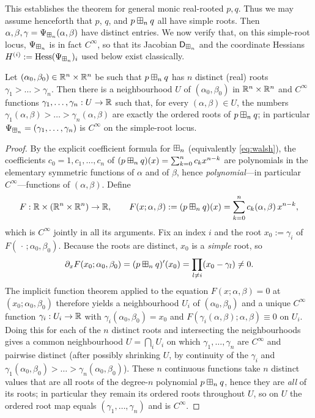 This establishes the theorem for general monic real-rooted $p,q$. Thus we may assume henceforth that $p$, $q$,
and $p\boxplus_n q$ all have simple roots. Then
$\alpha,\beta,\gamma=\Psi_{\boxplus_n}(\alpha,\beta)$ have distinct entries. We now
verify that, on this simple-root locus, $\Psi_{\boxplus_n}$ is in fact $C^\infty$, so
that its Jacobian $\mathsf{D}_{\boxplus_n}$ and the coordinate Hessians
$H^{(i)}:=\operatorname{Hess}(\Psi_{\boxplus_n})_i$ used below exist classically.

\begin{qfourlemma}\label{lem:smooth}
Let $(\alpha_0,\beta_0)\in\mathbb{R}^n\times\mathbb{R}^n$ be such that $p\boxplus_n q$
has $n$ distinct (real) roots $\gamma_1>\dots>\gamma_n$. Then there is a
neighbourhood $U$ of $(\alpha_0,\beta_0)$ in $\mathbb{R}^n\times\mathbb{R}^n$ and
$C^\infty$ functions $\gamma_1,\dots,\gamma_n:U\to\mathbb{R}$ such that, for every
$(\alpha,\beta)\in U$, the numbers $\gamma_1(\alpha,\beta)>\dots>\gamma_n(\alpha,\beta)$
are exactly the ordered roots of $p\boxplus_n q$; in particular
$\Psi_{\boxplus_n}=(\gamma_1,\dots,\gamma_n)$ is $C^\infty$ on the simple-root locus.
\end{qfourlemma}

\begin{proof}
By the explicit coefficient formula for $\boxplus_n$ (equivalently \eqref{eq:walsh}),
the coefficients $c_0=1,c_1,\dots,c_n$ of
$(p\boxplus_n q)(x)=\sum_{k=0}^n c_k x^{n-k}$ are polynomials in the elementary
symmetric functions of $\alpha$ and of $\beta$, hence \emph{polynomial}—in
particular $C^\infty$—functions of $(\alpha,\beta)$. Define
\[
F:\mathbb{R}\times(\mathbb{R}^n\times\mathbb{R}^n)\to\mathbb{R},\qquad
F(x;\alpha,\beta):=(p\boxplus_n q)(x)=\sum_{k=0}^n c_k(\alpha,\beta)\,x^{n-k},
\]
which is $C^\infty$ jointly in all its arguments. Fix an index $i$ and the root
$x_0:=\gamma_i$ of $F(\,\cdot\,;\alpha_0,\beta_0)$. Because the roots are
distinct, $x_0$ is a \emph{simple} root, so
\[
\partial_x F(x_0;\alpha_0,\beta_0)=(p\boxplus_n q)'(x_0)
=\prod_{l\ne i}(x_0-\gamma_l)\neq 0 .
\]
The implicit function theorem applied to the equation $F(x;\alpha,\beta)=0$ at
$(x_0;\alpha_0,\beta_0)$ therefore yields a neighbourhood $U_i$ of
$(\alpha_0,\beta_0)$ and a unique $C^\infty$ function
$\gamma_i:U_i\to\mathbb{R}$ with $\gamma_i(\alpha_0,\beta_0)=x_0$ and
$F(\gamma_i(\alpha,\beta);\alpha,\beta)\equiv 0$ on $U_i$. Doing this for each of
the $n$ distinct roots and intersecting the neighbourhoods gives a common
neighbourhood $U=\bigcap_i U_i$ on which $\gamma_1,\dots,\gamma_n$ are $C^\infty$
and pairwise distinct (after possibly shrinking $U$, by continuity of the
$\gamma_i$ and $\gamma_1(\alpha_0,\beta_0)>\dots>\gamma_n(\alpha_0,\beta_0)$).
These $n$ continuous functions take $n$ distinct values that are all roots of the
degree-$n$ polynomial $p\boxplus_n q$, hence they are \emph{all} of its roots; in
particular they remain its ordered roots throughout $U$, so on $U$ the ordered
root map equals $(\gamma_1,\dots,\gamma_n)$ and is $C^\infty$.
\end{proof}

